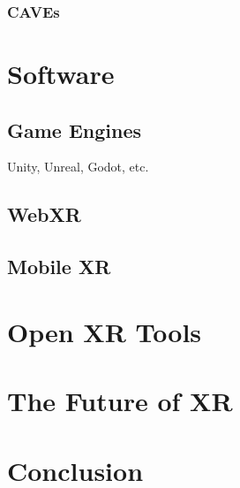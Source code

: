 \subsubsection{CAVEs}

\section{Software}
\subsection{Game Engines}
Unity, Unreal, Godot, etc.

\subsection{WebXR}



\subsection{Mobile XR}
\section{Open XR Tools }
\section{The Future of XR}
\section{Conclusion}



